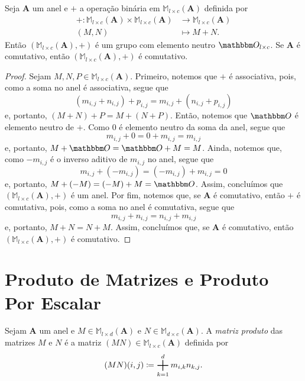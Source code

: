 \begin{prop}
	Seja $\bm A$ um anel e $+$ a operação binária em $\mathbb M_{l \times c}(\bm A)$ definida por
	\begin{align*}
	+: \mathbb M_{l \times c}(\bm A) \times \mathbb M_{l \times c}(\bm A) &\to \mathbb M_{l \times c}(\bm A) \\
	(M,N) &\mapsto M+N.
	\end{align*}
Então $(\mathbb M_{l \times c}(\bm A),+)$ é um grupo com elemento neutro $\zero_{l \times c}$. Se $\bm A$ é comutativo, então $(\mathbb M_{l \times c}(\bm A),+)$ é comutativo.
\end{prop}
\begin{proof}
	Sejam $M,N,P \in \mathbb M_{l \times c}(\bm A)$. Primeiro, notemos que $+$ é associativa, pois, como a soma no anel é associativa, segue que
	\begin{equation*}
	(m_{i,j}+n_{i,j})+p_{i,j} = m_{i,j}+(n_{i,j}+p_{i,j})
	\end{equation*}
e, portanto, $(M+N)+P=M+(N+P)$. Então, notemos que $\zero$ é elemento neutro de $+$. Como $0$ é elemento neutro da soma da anel, segue que
	\begin{equation*}
	m_{i,j}+0 = 0+m_{i,j} = m_{i,j}
	\end{equation*}
e, portanto, $M+\zero=\zero+M=M$. Ainda, notemos que, como $-m_{i,j}$ é o inverso aditivo de $m_{i,j}$ no anel, segue que
	\begin{equation*}
	m_{i,j}+(-m_{i,j}) = (-m_{i,j})+m_{i,j} = 0
	\end{equation*}
e, portanto, $M+(-M)=(-M)+M=\zero$.	Assim, concluímos que $(\mathbb M_{l \times c}(\bm A),+)$ é um anel. Por fim, notemos que, se $\bm A$ é comutativo, então $+$ é comutativa, pois, como a soma no anel é comutativa, segue que
	\begin{equation*}
	m_{i,j}+n_{i,j} = n_{i,j}+m_{i,j}
	\end{equation*}
e, portanto, $M+N=N+M$. Assim, concluímos que, se $\bm A$ é comutativo, então $(\mathbb M_{l \times c}(\bm A),+)$ é comutativo.
\end{proof}

\section{Produto de Matrizes e Produto Por Escalar}

\begin{defi}
	Sejam $\bm A$ um anel e $M \in \mathbb M_{l \times d}(\bm A)$ e $N \in \mathbb M_{d \times c}(\bm A)$. A \emph{matriz produto} das matrizes $M$ e $N$ é a matriz $(MN) \in \mathbb M_{l \times c}(\bm A)$ definida por
	\begin{equation*}
	(MN)(i,j) \coloneqq \bigsum_{k=1}^d m_{i,k}n_{k,j}.
	\end{equation*}
\end{defi}

